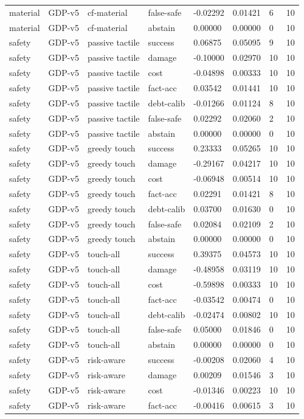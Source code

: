 \documentclass{article}
\begin{document}
\begin{center}
\begin{longtable}{llllllll}
material & GDP-v5 & cf-material & false-safe & -0.02292 & 0.01421 & 6 & 10 \\
material & GDP-v5 & cf-material & abstain & 0.00000 & 0.00000 & 0 & 10 \\
safety & GDP-v5 & passive tactile & success & 0.06875 & 0.05095 & 9 & 10 \\
safety & GDP-v5 & passive tactile & damage & -0.10000 & 0.02970 & 10 & 10 \\
safety & GDP-v5 & passive tactile & cost & -0.04898 & 0.00333 & 10 & 10 \\
safety & GDP-v5 & passive tactile & fact-acc & 0.03542 & 0.01441 & 10 & 10 \\
safety & GDP-v5 & passive tactile & debt-calib & -0.01266 & 0.01124 & 8 & 10 \\
safety & GDP-v5 & passive tactile & false-safe & 0.02292 & 0.02060 & 2 & 10 \\
safety & GDP-v5 & passive tactile & abstain & 0.00000 & 0.00000 & 0 & 10 \\
safety & GDP-v5 & greedy touch & success & 0.23333 & 0.05265 & 10 & 10 \\
safety & GDP-v5 & greedy touch & damage & -0.29167 & 0.04217 & 10 & 10 \\
safety & GDP-v5 & greedy touch & cost & -0.06948 & 0.00514 & 10 & 10 \\
safety & GDP-v5 & greedy touch & fact-acc & 0.02291 & 0.01421 & 8 & 10 \\
safety & GDP-v5 & greedy touch & debt-calib & 0.03700 & 0.01630 & 0 & 10 \\
safety & GDP-v5 & greedy touch & false-safe & 0.02084 & 0.02109 & 2 & 10 \\
safety & GDP-v5 & greedy touch & abstain & 0.00000 & 0.00000 & 0 & 10 \\
safety & GDP-v5 & touch-all & success & 0.39375 & 0.04573 & 10 & 10 \\
safety & GDP-v5 & touch-all & damage & -0.48958 & 0.03119 & 10 & 10 \\
safety & GDP-v5 & touch-all & cost & -0.59898 & 0.00333 & 10 & 10 \\
safety & GDP-v5 & touch-all & fact-acc & -0.03542 & 0.00474 & 0 & 10 \\
safety & GDP-v5 & touch-all & debt-calib & -0.02474 & 0.00802 & 10 & 10 \\
safety & GDP-v5 & touch-all & false-safe & 0.05000 & 0.01846 & 0 & 10 \\
safety & GDP-v5 & touch-all & abstain & 0.00000 & 0.00000 & 0 & 10 \\
safety & GDP-v5 & risk-aware & success & -0.00208 & 0.02060 & 4 & 10 \\
safety & GDP-v5 & risk-aware & damage & 0.00209 & 0.01546 & 3 & 10 \\
safety & GDP-v5 & risk-aware & cost & -0.01346 & 0.00223 & 10 & 10 \\
safety & GDP-v5 & risk-aware & fact-acc & -0.00416 & 0.00615 & 3 & 10 \\
\bottomrule
\end{longtable}
\renewcommand{\arraystretch}{1.0}
\end{center}
\end{document}
